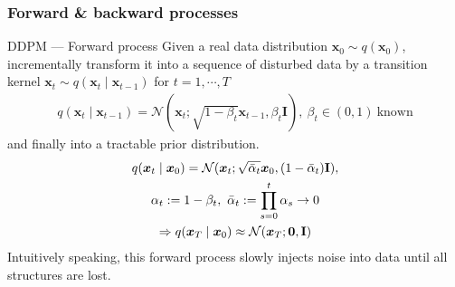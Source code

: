 \documentclass[10pt]{beamer}
\begin{document}
\subsubsection{Forward \& backward processes}

\begin{frame}{DDPM --- \normalsize Forward process}
    Given a real data distribution $\bm{x}_0\sim q(\bm{x}_0)$, incrementally transform it into a sequence of disturbed data 
    by a transition kernel $\bm{x}_t\sim q(\bm{x}_t\mid\bm{x}_{t-1})$ for $t=1,\cdots,T$
    \begin{gather}
        q(\bm{x}_t\mid\bm{x}_{t-1}) = \mathcal{N}(\bm{x}_t;\sqrt{1-\beta_t}\bm{x}_{t-1}, \beta_t\mathbf{I}),~\beta_t\in (0,1)~\text{known}\label{eq:ddpm}
    \end{gather}
    and finally into a tractable prior distribution.
    \begin{gather*}
        q(\bm{x}_t\mid\bm{x}_0) = \mathcal{N}(\bm{x}_t;\sqrt{\Bar{\alpha}_t}\bm{x}_0,(1-\Bar{\alpha}_t)\mathbf{I}),\\
        \alpha_t := 1-\beta_t,~\Bar{\alpha}_t:=\prod_{s=0}^t\alpha_s \to 0\\
        \Rightarrow q(\bm{x}_T\mid \bm{x}_0) \approx \mathcal{N}(\bm{x}_T;\bm{0},\mathbf{I})
    \end{gather*}
    Intuitively speaking, this forward process slowly injects noise into data until all structures are lost. 
\end{frame}

\end{document}
